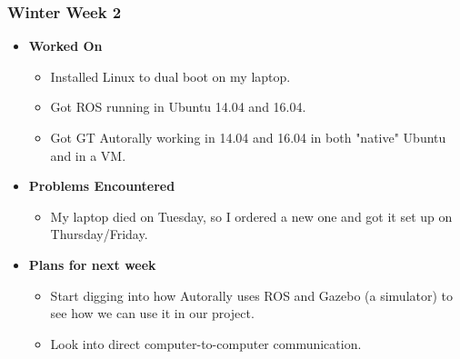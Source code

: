\documentclass{article}
\begin{document}
\subsubsection{Winter Week 2}
\begin{itemize}
    \item {\textbf{Worked On}}
    \begin{itemize}
        \item Installed Linux to dual boot on my laptop.
        \item Got ROS running in Ubuntu 14.04 and 16.04.
        \item Got GT Autorally working in 14.04 and 16.04 in both "native" Ubuntu and in a VM.
    \end{itemize}

    \item {\textbf{Problems Encountered}}
    \begin{itemize}
        \item My laptop died on Tuesday, so I ordered a new one and got it set up on Thursday/Friday.
    \end{itemize}

    \item{\textbf{Plans for next week}}
    \begin{itemize}
        \item Start digging into how Autorally uses ROS and Gazebo (a simulator) to see how we can use it in our project.
        \item Look into direct computer-to-computer communication.
    \end{itemize}
\end{itemize}
\end{document}
